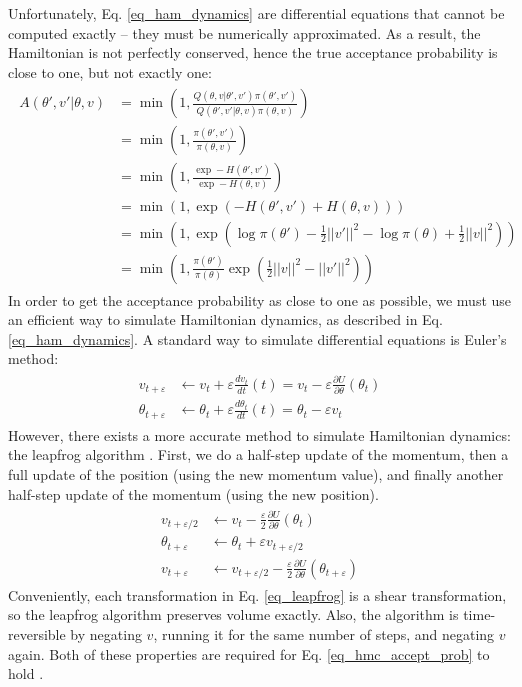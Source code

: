 \documentclass[12pt]{article}
\begin{document}
Unfortunately, Eq. \ref{eq_ham_dynamics} are differential equations that cannot be computed exactly -- they must be numerically approximated. As a result, the Hamiltonian is not perfectly conserved, hence the true acceptance probability is close to one, but not exactly one:
\begin{align}
\begin{split}
A(\theta',v'|\theta,v) &= \min \left(1, \frac{Q(\theta,v|\theta',v')\pi(\theta',v')}{Q(\theta',v'|\theta,v)\pi(\theta,v)} \right) \\
&= \min \left(1, \frac{\pi(\theta',v')}{\pi(\theta,v)} \right) \\
&= \min \left(1, \frac{\exp -H(\theta',v')}{\exp -H(\theta,v)} \right) \\
&= \min \left(1, \exp \left(-H(\theta', v') + H(\theta, v) \right) \right) \\
&= \min \left(1, \exp \left(\log \pi(\theta') - \frac{1}{2}||v'||^2 -\log \pi(\theta) + \frac{1}{2}||v||^2 \right) \right) \\
&= \min \left(1, \frac{\pi(\theta')}{\pi(\theta)} \exp \left( \frac{1}{2}||v||^2 - ||v'||^2 \right) \right)
\end{split}
\label{eq_hmc_accept_prob}
\end{align}
In order to get the acceptance probability as close to one as possible, we must use an efficient way to simulate Hamiltonian dynamics, as described in Eq. \ref{eq_ham_dynamics}. A standard way to simulate differential equations is Euler’s method:
\begin{align}
\begin{split}
v_{t+\varepsilon} &\leftarrow v_t + \varepsilon \frac{dv_t}{dt}(t) = v_t - \varepsilon \frac{\partial U}{\partial \theta}(\theta_t) \\
\theta_{t+\varepsilon} &\leftarrow \theta_t + \varepsilon \frac{d\theta_t}{dt}(t) = \theta_t - \varepsilon v_t
\end{split}
\end{align}
However, there exists a more accurate method to simulate Hamiltonian dynamics: the leapfrog algorithm \cite{hmc}. First, we do a half-step update of the momentum, then a full update of the position (using the new momentum value), and finally another half-step update of the momentum (using the new position).
\begin{align}
\begin{split}
v_{t+\varepsilon/2} &\leftarrow v_t - \frac{\varepsilon}{2} \frac{\partial U}{\partial \theta}(\theta_t) \\
\theta_{t+\varepsilon} &\leftarrow \theta_t + \varepsilon v_{t+\varepsilon/2} \\
v_{t+\varepsilon} &\leftarrow v_{t+\varepsilon/2} - \frac{\varepsilon}{2} \frac{\partial U}{\partial \theta}(\theta_{t+\varepsilon})
\end{split}
\label{eq_leapfrog}
\end{align}
Conveniently, each transformation in Eq. \ref{eq_leapfrog} is a shear transformation, so the leapfrog algorithm preserves volume exactly. Also, the algorithm is time-reversible by negating $v$, running it for the same number of steps, and negating $v$ again. Both of these properties are required for Eq. \ref{eq_hmc_accept_prob} to hold \cite{hmc}.
\end{document}
